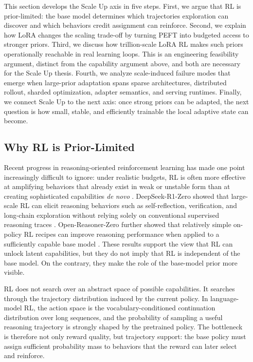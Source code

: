 \documentclass{llmxive}
\providecommand{\pony}[1]{#1}
\begin{document}
\pony{This section develops the Scale Up axis in five steps. First, we argue that RL is prior-limited: the base model determines which trajectories exploration can discover and which behaviors credit assignment can reinforce. Second, we explain how LoRA changes the scaling trade-off by turning PEFT into budgeted access to stronger priors. Third, we discuss how trillion-scale LoRA RL makes such priors operationally reachable in real learning loops. This is an engineering feasibility argument, distinct from the capability argument above, and both are necessary for the Scale Up thesis. Fourth, we analyze scale-induced failure modes that emerge when large-prior adaptation spans sparse architectures, distributed rollout, sharded optimization, adapter semantics, and serving runtimes. Finally, we connect Scale Up to the next axis: once strong priors can be adapted, the next question is how small, stable, and efficiently trainable the local adaptive state can become.}

\subsection{Why RL is Prior-Limited}\label{subsec:prior-limited}

Recent progress in reasoning-oriented reinforcement learning has made one point increasingly difficult to ignore: under realistic budgets, RL is often more effective at amplifying behaviors that already exist in weak or unstable form than at creating sophisticated capabilities \emph{de novo} \citep{deepseek2025r1,hu2025openreasonerzero}. DeepSeek-R1-Zero showed that large-scale RL can elicit reasoning behaviors such as self-reflection, verification, and long-chain exploration without relying solely on conventional supervised reasoning traces \citep{deepseek2025r1}. Open-Reasoner-Zero further showed that relatively simple on-policy RL recipes can improve reasoning performance when applied to a sufficiently capable base model \citep{hu2025openreasonerzero}. These results support the view that RL can unlock latent capabilities, but they do not imply that RL is independent of the base model. On the contrary, they make the role of the base-model prior more visible.

RL does not search over an abstract space of possible capabilities. It searches through the trajectory distribution induced by the current policy. In language-model RL, the action space is the vocabulary-conditioned continuation distribution over long sequences, and the probability of sampling a useful reasoning trajectory is strongly shaped by the pretrained policy. The bottleneck is therefore not only reward quality, but trajectory support: the base policy must assign sufficient probability mass to behaviors that the reward can later select and reinforce.
\end{document}
